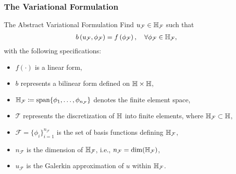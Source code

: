 \begin{frame}
\frametitle{The Variational Formulation}
    \begin{block}{The Abstract Variational Formulation}
        Find $u_{\mathcal{F}} \in \mathbb{H}_{\mathcal{F}}$ such that
        \begin{align}
        \label{eq:directH1}
            b\left(u_{\mathcal{F}},\phi_{\mathcal{F}}\right) = f\left(\phi_{\mathcal{F}}\right), \quad \forall \phi_{\mathcal{F}} \in \mathbb{H}_{\mathcal{F}},
        \end{align}
        with the following specifications:
        \begin{itemize}
            \item $f(\cdot)$ is a linear form,
            \item $b$ represents a bilinear form defined on $\mathbb{H} \times \mathbb{H}$,
            \item $\mathbb{H}_{\mathcal{F}} \coloneqq \textrm{span}\{\phi_{1}, \dots, \phi_{n_{\mathcal{F}}}\}$ denotes the finite element space,
            \item $\mathcal{T}$ represents the discretization of $\mathbb{H}$ into finite elements, where $\mathbb{H}_{\mathcal{F}} \subset \mathbb{H}$,
            \item $\mathcal{F} = \{\phi_{i}\}_{i=1}^{n_{\mathcal{F}}}$ is the set of basis functions defining $\mathbb{H}_{\mathcal{F}}$,
            \item $n_{\mathcal{F}}$ is the dimension of $\mathbb{H}_{\mathcal{F}}$, i.e., $n_{\mathcal{F}} = \textrm{dim}(\mathbb{H}_{\mathcal{F}})$,
            \item $u_{\mathcal{F}}$ is the Galerkin approximation of $u$ within $\mathbb{H}_{\mathcal{F}}$.
        \end{itemize}
    \end{block}     
\end{frame}

